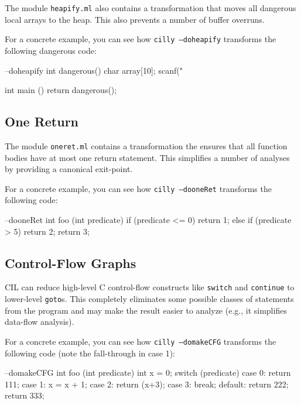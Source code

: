 \documentclass{article}
\def\t#1{{\tt #1}}
\begin{document}
The module \t{heapify.ml} also contains a transformation that moves all
dangerous local arrays to the heap. This also prevents a number of buffer
overruns. 

For a concrete example, you can see how \t{cilly --doheapify}
transforms the following dangerous code: 

\begin{cilcode}[global] --doheapify
  int dangerous() {
    char array[10];
    scanf("%
  }

  int main () {
    return dangerous();
  }
\end{cilcode}

\subsection{One Return}

The module \t{oneret.ml} contains a transformation the ensures that all
function bodies have at most one return statement. This simplifies a number
of analyses by providing a canonical exit-point. 

For a concrete example, you can see how \t{cilly --dooneRet}
transforms the following code: 

\begin{cilcode}[global] --dooneRet
  int foo (int predicate) {
    if (predicate <= 0) {
      return 1;
    } else {
      if (predicate > 5)
        return 2;
      return 3;
    }
  }
\end{cilcode}

\subsection{Control-Flow Graphs}

CIL can reduce high-level C control-flow constructs like \t{switch} and
\t{continue} to lower-level \t{goto}s. This completely eliminates some
possible classes of statements from the program and may make the result
easier to analyze (e.g., it simplifies data-flow analysis). 

For a concrete example, you can see how \t{cilly --domakeCFG}
transforms the following code (note the fall-through in case 1): 

\begin{cilcode}[global] --domakeCFG
  int foo (int predicate) {
    int x = 0;
    switch (predicate) {
      case 0: return 111;
      case 1: x = x + 1;
      case 2: return (x+3);
      case 3: break;
      default: return 222;
    }
    return 333;
  }
\end{cilcode}
\end{document}
